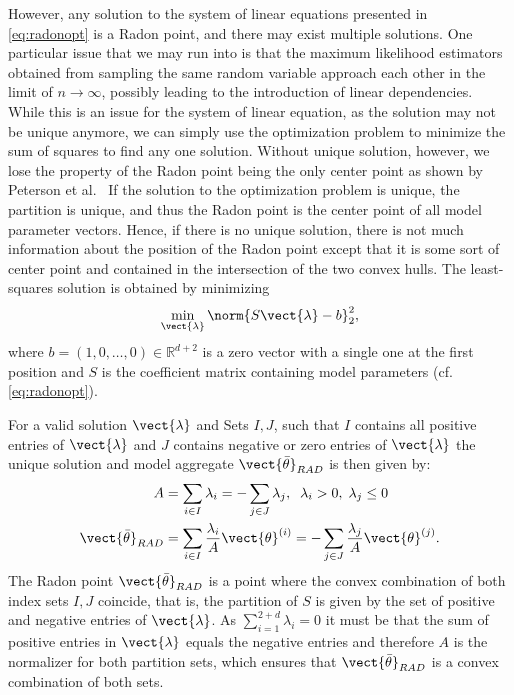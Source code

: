 However, any solution to the system of linear equations presented in \autoref{eq:radonopt} is a Radon point, and there may exist multiple solutions.
One particular issue that we may run into is that the maximum likelihood estimators obtained from sampling the same random variable approach each other in the limit of $n \rightarrow \infty$, possibly leading to the introduction of linear dependencies.
While this is an issue for the system of linear equation, as the solution may not be unique anymore, we can simply use the optimization problem to minimize the sum of squares to find any one solution.
Without unique solution, however, we lose the property of the Radon point being the only center point as shown by Peterson et al.~\cite{peterson1972geometry}
If the solution to the optimization problem is unique, the partition is unique, and thus the Radon point is the center point of all model parameter vectors.
Hence, if there is no unique solution, there is not much information about the position of the Radon point except that it is some sort of center point and contained in the intersection of the two convex hulls.
The least-squares solution is obtained by minimizing
\begin{equation}
    \label{eq:lstsq}
        \min_{\vect{\lambda}} \norm{S\vect{\lambda} - b}^2_2,
\end{equation}
where $b=(1, 0, \ldots, 0) \in \mathbb{R}^{d+2}$ is a zero vector with a single one at the first position and $S$ is the coefficient matrix containing model parameters (cf. \autoref{eq:radonopt}).

For a valid solution $\vect{\lambda}$ and Sets $I,J$, such that $I$ contains all positive entries of $\vect{\lambda}$ and $J$ contains negative or zero entries of $\vect{\lambda}$ the unique solution and model aggregate $\vect{\bar{\theta}}_{RAD}$ is then given by:
\begin{equation}
    \label{eq:radonpoint}
    \begin{split}
    A &= \sum_{i\in I} \lambda_i = - \sum_{j\in J} \lambda_j, \; \;\lambda_i > 0, \; \lambda_j \leq 0 \\
    \vect{\bar{\theta}}_{RAD} &= \sum_{i\in I} \frac{\lambda_i}{A} \vect{\theta}^{(i)} = - \sum_{j\in J} \frac{\lambda_j}{A} \vect{\theta}^{(j)}.
    \end{split}
\end{equation}
The Radon point $\vect{\bar{\theta}}_{RAD}$ is a point where the convex combination of both index sets $I, J$ coincide, that is, the partition of $S$ is given by the set of positive and negative entries of $\vect{\lambda}$.
As $\sum_{i=1}^{2+d} \lambda_i = 0$ it must be that the sum of positive entries in $\vect{\lambda}$ equals the negative entries and therefore $A$ is the normalizer for both partition sets, which ensures that $\vect{\bar{\theta}}_{RAD}$ is a convex combination of both sets.

